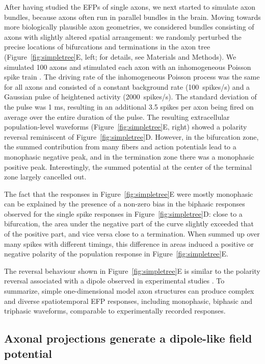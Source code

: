 \documentclass[]{elife}
\begin{document}
After having studied the EFPs of single axons, we next started to
simulate axon bundles, because axons often run in parallel bundles in
the brain. Moving towards more biologically plausible axon geometries,
we considered bundles consisting of axons with slightly altered spatial
arrangement: we randomly perturbed the precise locations of bifurcations
and terminations in the axon tree (Figure~\ref{fig:simpletree}E, left;
for details, see Materials and Methods). We simulated 100 axons and
stimulated each axon with an inhomogeneous Poisson spike train
\citep{Kuokkanen2010Origin, Softky1993Highly}. The driving rate of the
inhomogeneous Poisson process was the same for all axons and consisted
of a constant background rate (100~spikes/s) and a Gaussian pulse of
heightened activity (2000~spikes/s). The standard deviation of the pulse
was 1 ms, resulting in an additional 3.5 spikes per axon being fired on
average over the entire duration of the pulse. The resulting
extracellular population-level waveforms (Figure~\ref{fig:simpletree}E,
right) showed a polarity reversal reminiscent of
Figure~\ref{fig:simpletree}D. However, in the bifurcation zone, the
summed contribution from many fibers and action potentials lead to a
monophasic negative peak, and in the termination zone there was a
monophasic positive peak. Interestingly, the summed potential at the
center of the terminal zone largely cancelled out.

The fact that the responses in Figure~\ref{fig:simpletree}E were mostly
monophasic can be explained by the presence of a non-zero bias in the
biphasic responses observed for the single spike responses in
Figure~\ref{fig:simpletree}D: close to a bifurcation, the area under the
negative part of the curve slightly exceeded that of the positive part,
and vice versa close to a termination. When summed up over many spikes
with different timings, this difference in areas induced a positive or
negative polarity of the population response in
Figure~\ref{fig:simpletree}E.

The reversal behaviour shown in Figure~\ref{fig:simpletree}E is similar
to the polarity reversal associated with a dipole observed in
experimental studies
\citep{Swadlow2000Influence, Swadlow2002Activation, Blot2014Ultrarapid}.
To summarize, simple one-dimensional model axon structures can produce
complex and diverse spatiotemporal EFP responses, including monophasic,
biphasic and triphasic waveforms, comparable to experimentally recorded
responses.

\subsection{Axonal projections generate a dipole-like field
potential}\label{axonal-projections-generate-a-dipole-like-field-potential}
\end{document}
